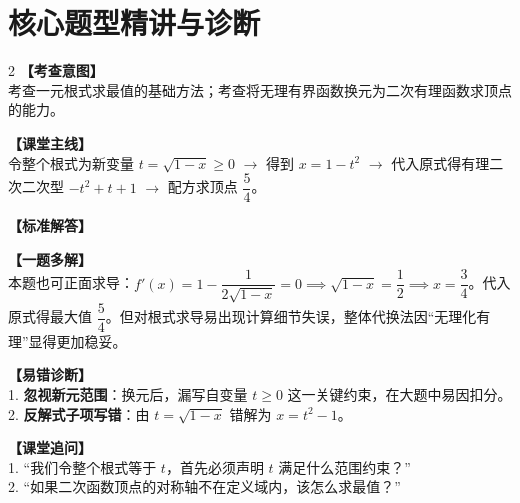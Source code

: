 \documentclass[11pt,a4paper]{ctexart}
\begin{document}
\newpage

\section{核心题型精讲与诊断}

\qOneStem
\qOneOptions

\begin{paracol}{2}
  \textbf{【考查意图】}\\
  考查一元根式求最值的基础方法；考查将无理有界函数换元为二次有理函数求顶点的能力。
  
  \textbf{【课堂主线】}\\
  令整个根式为新变量 \(t = \sqrt{1-x} \geqslant 0\) \(\to\) 得到 \(x = 1-t^2\) \(\to\) 代入原式得有理二次二次型 \(-t^2+t+1\) \(\to\) 配方求顶点 \(\dfrac{5}{4}\)。
  
  \textbf{【标准解答】}\\
  \qOneSolution
  
  \textbf{【一题多解】}\\
  本题也可正面求导：\(f'(x) = 1 - \dfrac{1}{2\sqrt{1-x}} = 0 \implies \sqrt{1-x} = \dfrac{1}{2} \implies x = \dfrac{3}{4}\)。代入原式得最大值 \(\dfrac{5}{4}\)。但对根式求导易出现计算细节失误，整体代换法因“无理化有理”显得更加稳妥。

  \switchcolumn
  \textbf{【易错诊断】}\\
  1. \textbf{忽视新元范围}：换元后，漏写自变量 \(t \geqslant 0\) 这一关键约束，在大题中易因扣分。\\
  2. \textbf{反解式子项写错}：由 \(t=\sqrt{1-x}\) 错解为 \(x=t^2-1\)。
  
  \textbf{【课堂追问】}\\
  1. “我们令整个根式等于 \(t\)，首先必须声明 \(t\) 满足什么范围约束？”\\
  2. “如果二次函数顶点的对称轴不在定义域内，该怎么求最值？”
\end{paracol}

\vspace{0.8em}
\par{}
\vspace{0.8em}

\qTwoStem
\qTwoOptions
\end{document}
